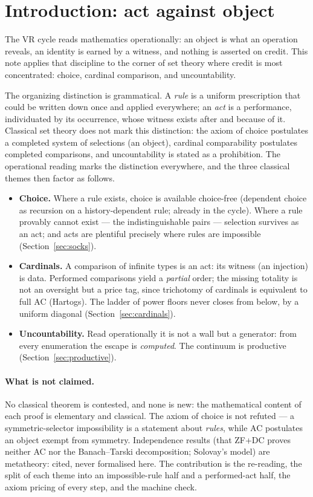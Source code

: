 \documentclass[11pt]{article}
\theoremstyle{remark}
\begin{document}
\section{Introduction: act against object}

The VR cycle reads mathematics operationally: an object is what an
operation reveals, an identity is earned by a witness, and nothing is
asserted on credit.  This note applies that discipline to the corner of
set theory where credit is most concentrated: choice, cardinal
comparison, and uncountability.

The organizing distinction is grammatical.  A \emph{rule} is a uniform
prescription that could be written down once and applied everywhere; an
\emph{act} is a performance, individuated by its occurrence, whose
witness exists after and because of it.  Classical set theory does not
mark this distinction: the axiom of choice postulates a completed system
of selections (an object), cardinal comparability postulates completed
comparisons, and uncountability is stated as a prohibition.  The
operational reading marks the distinction everywhere, and the three
classical themes then factor as follows.

\begin{itemize}
\item \textbf{Choice.}  Where a rule exists, choice is available
  choice-free (dependent choice as recursion on a history-dependent
  rule; already in the cycle).  Where a rule provably cannot exist ---
  the indistinguishable pairs --- selection survives as an act; and acts
  are plentiful precisely where rules are impossible
  (Section~\ref{sec:socks}).
\item \textbf{Cardinals.}  A comparison of infinite types is an act:
  its witness (an injection) is data.  Performed comparisons yield a
  \emph{partial} order; the missing totality is not an oversight but a
  price tag, since trichotomy of cardinals is equivalent to full AC
  (Hartogs).  The ladder of power floors never closes from below, by a
  uniform diagonal (Section~\ref{sec:cardinals}).
\item \textbf{Uncountability.}  Read operationally it is not a wall but
  a generator: from every enumeration the escape is \emph{computed}.
  The continuum is productive (Section~\ref{sec:productive}).
\end{itemize}

\paragraph{What is not claimed.}  No classical theorem is contested, and
none is new: the mathematical content of each proof is elementary and
classical.  The axiom of choice is not refuted --- a symmetric-selector
impossibility is a statement about \emph{rules}, while AC postulates an
object exempt from symmetry.  Independence results (that ZF+DC proves
neither AC nor the Banach--Tarski decomposition; Solovay's model) are
metatheory: cited, never formalised here.  The contribution is the
re-reading, the split of each theme into an impossible-rule half and a
performed-act half, the axiom pricing of every step, and the machine
check.
\end{document}
